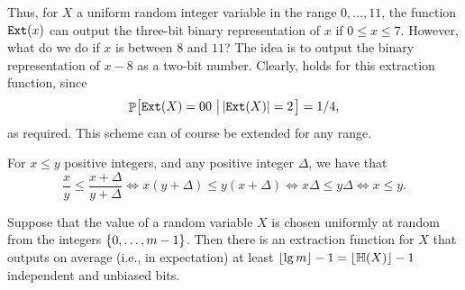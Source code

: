 Thus, for $X$ a uniform random integer variable in the range
$0,\ldots, 11$, the function $\mathtt{E{x}t}(x)$ can output the three-bit binary
representation of $x$ if $0 \leq x \leq 7$. However, what do we do if
$x$ is between $8$ and $11$? The idea is to output the binary
representation of $x -8$ as a two-bit number. Clearly,
 holds for this extraction function, since
\[
\Prob{\ExtractFunc(X) = 00 \sep{ \cardin{\ExtractFunc(X)} = 2}} =
{1}/{4},
\]
as required. This scheme can of course be extended for any range.

\begin{tedium}
    For $x \leq y$ positive integers, and any positive integer
    $\Delta$, we have that
    \begin{equation*}
        \frac{x}{y}
        \leq%
        \frac{x + \Delta}{y+\Delta}
        \iff
        x( y+ \Delta) \leq y(x+\Delta)
        \iff
        x \Delta \leq y\Delta
        \iff
        x \leq y.
    \end{equation*}
\end{tedium}

\begin{theorem}
    Suppose that the value of a random variable $X$ is chosen
    uniformly at random from the integers $\left\{ {0,\ldots, m-1} \right\}$. Then
    there is an extraction function for $X$ that outputs on average
    (i.e., in expectation) at least $\floor{ \lg m} -1 =
    \floor{\Entropy{X}} -1$ independent and unbiased bits.
\end{theorem}

